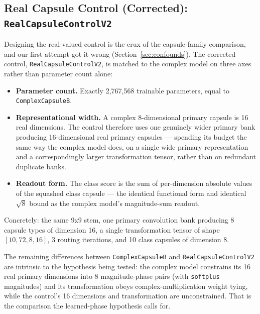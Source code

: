 \documentclass[11pt]{article}
\begin{document}
\subsection{Real Capsule Control (Corrected): \texttt{RealCapsuleControlV2}}
\label{sec:controlv2}
Designing the real-valued control is the crux of the capsule-family comparison, and our first attempt got it wrong (Section~\ref{sec:confounds}). The corrected control, \texttt{RealCapsuleControlV2}, is matched to the complex model on three axes rather than parameter count alone:
\begin{itemize}
  \item \textbf{Parameter count.} Exactly 2{,}767{,}568 trainable parameters, equal to \texttt{ComplexCapsuleB}.
  \item \textbf{Representational width.} A complex 8-dimensional primary capsule is 16 real dimensions. The control therefore uses one genuinely wider primary bank producing 16-dimensional real primary capsules --- spending its budget the same way the complex model does, on a single wide primary representation and a correspondingly larger transformation tensor, rather than on redundant duplicate banks.
  \item \textbf{Readout form.} The class score is the sum of per-dimension absolute values of the squashed class capsule --- the identical functional form and identical $\sqrt{8}$ bound as the complex model's magnitude-sum readout.
\end{itemize}

Concretely: the same 9x9 stem, one primary convolution bank producing 8 capsule types of dimension 16, a single transformation tensor of shape $[10, 72, 8, 16]$, 3 routing iterations, and 10 class capsules of dimension 8.

The remaining differences between \texttt{ComplexCapsuleB} and \texttt{RealCapsuleControlV2} are intrinsic to the hypothesis being tested: the complex model constrains its 16 real primary dimensions into 8 magnitude-phase pairs (with \texttt{softplus} magnitudes) and its transformation obeys complex-multiplication weight tying, while the control's 16 dimensions and transformation are unconstrained. That is the comparison the learned-phase hypothesis calls for.
\end{document}
